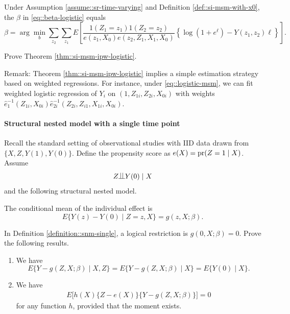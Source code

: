 \begin{theorem}
\label{thm::si-msm-ipw-logistic}
Under Assumption \ref{assume::sr-time-varying} and Definition \ref{def::si-msm-with-x0}, the $\beta$ in \eqref{eq::beta-logistic} equals 
$$
\beta = \arg\min_b \sum_{z_2}\sum_{z_1}  E\left[   \frac{  1(Z_1=z_1) 1(Z_2=z_2)   }{   e(z_1, X_0) e(z_2, Z_1, X_1, X_0)     }      
\left\{   \log (1 + e^{\ell })
- Y(z_1, z_2)  \ell  \right\} \right] .
$$
\end{theorem}

Prove Theorem \ref{thm::si-msm-ipw-logistic}. 

Remark: 
Theorem \ref{thm::si-msm-ipw-logistic} implies a simple estimation strategy based on weighted regressions. For instance, under \eqref{eq::logistic-msm}, we can fit weighted logistic regression of $Y_i$ on $(1,Z_{1i}, Z_{2i}, X_{0i})$ with weights $\hat{e}_{1}^{-1}(Z_{1i}, X_{0i})  \hat{e}_{2i}^{-1}(Z_{2i}, Z_{i1}, X_{1i}, X_{0i})$. 

 




\paragraph{Structural nested model with a single time point}\label{problem::snm-single-time}

 

Recall the standard setting of observational studies with IID data drawn from $\{ X,Z, Y(1), Y(0)\}$. Define the propensity score as $e(X) = \textup{pr}(Z=1\mid X)$. Assume
$$
Z\ind Y(0)\mid X
$$
and the following structural nested model.


\begin{definition}
\label{definition::snm-single}
The conditional mean of the individual effect is
$$
E\{  Y(z) - Y(0)\mid Z=z, X \} = g(z,X;\beta).
$$
\end{definition}

In Definition \ref{definition::snm-single}, a logical restriction is $g(0,X;\beta) = 0$. Prove the following results.


\begin{enumerate}
\item
We have
$$
E\{  Y - g(Z,X;\beta) \mid X, Z\} = E\{  Y - g(Z,X;\beta) \mid X\}  = E\{  Y(0) \mid X\}. 
$$


\item
We have
\begin{eqnarray}\label{eq::Estimating-equation-snm-1}
E\Big [  h(X)  \{ Z-e(X) \}   \{  Y - g(Z,X;\beta) \}  \Big ] = 0
\end{eqnarray}
for any function $h$, provided that the moment exists.
\end{enumerate}

